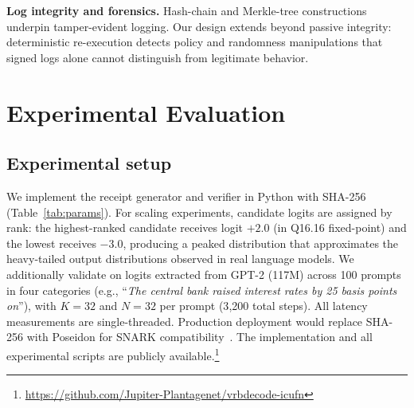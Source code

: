 \documentclass[conference]{IEEEtran}
\begin{document}
\textbf{Log integrity and forensics.}
Hash-chain and Merkle-tree constructions~\cite{Crosby2009TamperEvident} underpin tamper-evident logging. Our design extends beyond passive integrity: deterministic re-execution detects policy and randomness manipulations that signed logs alone cannot distinguish from legitimate behavior.

\section{Experimental Evaluation}\label{sec:eval}

\subsection{Experimental setup}
We implement the receipt generator and verifier in Python with SHA-256 (Table~\ref{tab:params}). For scaling experiments, candidate logits are assigned by rank: the highest-ranked candidate receives logit $+2.0$ (in Q16.16 fixed-point) and the lowest receives $-3.0$, producing a peaked distribution that approximates the heavy-tailed output distributions observed in real language models. We additionally validate on logits extracted from GPT-2 (117M) across 100 prompts in four categories (e.g., ``\textit{The central bank raised interest rates by 25 basis points on}''), with $K\!=\!32$ and $N\!=\!32$ per prompt (3{,}200 total steps). All latency measurements are single-threaded. Production deployment would replace SHA-256 with Poseidon for SNARK compatibility~\cite{Nova2022}. The implementation and all experimental scripts are publicly available.\footnote{\url{https://github.com/Jupiter-Plantagenet/vrbdecode-icufn}}
\end{document}
